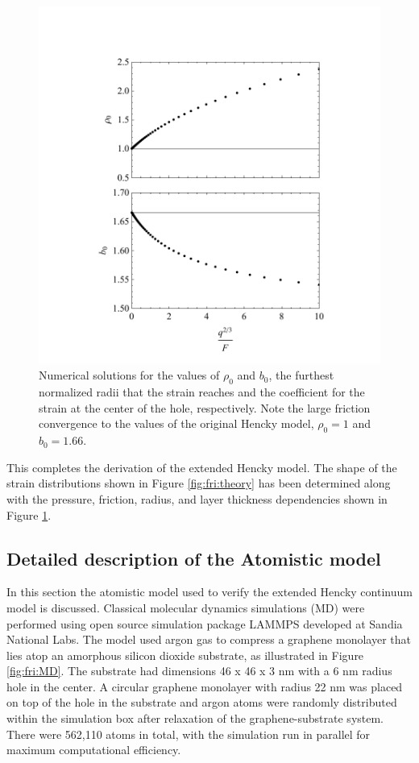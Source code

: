 \begin{figure}
	\begin{center}
	\includegraphics{Figs_Friction/b0rho0.pdf}
	\end{center}
	\caption[Numerical solutions for the values of $\rho_0$ and $b_0$]{\label{fig:fri:rho0b0} Numerical solutions for the values of $\rho_0$ and $b_0$, the furthest normalized radii that the strain reaches and the coefficient for the strain at the center of the hole, respectively. Note the large friction convergence to the values of the original Hencky model, $\rho_0 = 1$ and $b_0=1.66$.}
\end{figure}

This completes the derivation of the extended Hencky model.
The shape of the strain distributions shown in Figure \ref{fig:fri:theory} has been determined along with the pressure, friction, radius, and layer thickness dependencies shown in Figure \ref{fig:fri:rho0b0}.

\subsection{Detailed description of the Atomistic model}
In this section the atomistic model used to verify the extended Hencky continuum model is discussed.
Classical molecular dynamics simulations (MD) were performed using open source simulation package LAMMPS \cite{plimptonLAMMPS,PlimptonJCP1995} developed at Sandia National Labs.
The model used argon gas to compress a graphene monolayer that lies atop an amorphous silicon dioxide substrate, as illustrated in Figure \ref{fig:fri:MD}.
The substrate had dimensions 46 x 46 x 3 nm with a 6 nm radius hole in the center.
A circular graphene monolayer with radius 22 nm was placed on top of the hole in the substrate and argon atoms were randomly distributed within the simulation box after relaxation of the graphene-substrate system.
There were 562,110 atoms in total, with the simulation run in parallel for maximum computational efficiency.

